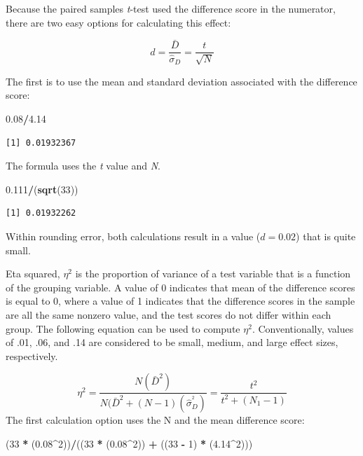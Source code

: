 \documentclass[
  11pt,
]{book}
\newenvironment{Shaded}{\begin{snugshade}}{\end{snugshade}}
\newcommand{\DecValTok}[1]{\textcolor[rgb]{0.06,0.06,0.06}{#1}}
\newcommand{\FloatTok}[1]{\textcolor[rgb]{0.06,0.06,0.06}{#1}}
\newcommand{\FunctionTok}[1]{\textcolor[rgb]{0.27,0.27,0.27}{\textbf{#1}}}
\newcommand{\NormalTok}[1]{#1}
\newcommand{\SpecialCharTok}[1]{\textcolor[rgb]{0.43,0.43,0.43}{\textbf{#1}}}
\begin{document}
Because the paired samples \emph{t}-test used the difference score in the numerator, there are two easy options for calculating this effect:

\[d=\frac{\bar{D}}{\hat\sigma_D}=\frac{t}{\sqrt{N}}\]

The first is to use the mean and standard deviation associated with the difference score:

\begin{Shaded}
\begin{Highlighting}[]
\FloatTok{0.08}\SpecialCharTok{/}\FloatTok{4.14}
\end{Highlighting}
\end{Shaded}

\begin{verbatim}
[1] 0.01932367
\end{verbatim}

The formula uses the \emph{t} value and \emph{N}.

\begin{Shaded}
\begin{Highlighting}[]
\FloatTok{0.111}\SpecialCharTok{/}\NormalTok{(}\FunctionTok{sqrt}\NormalTok{(}\DecValTok{33}\NormalTok{))}
\end{Highlighting}
\end{Shaded}

\begin{verbatim}
[1] 0.01932262
\end{verbatim}

Within rounding error, both calculations result in a value (\(d = 0.02\)) that is quite small.

Eta squared, \(\eta^2\) is the proportion of variance of a test variable that is a function of the grouping variable. A value of 0 indicates that mean of the difference scores is equal to 0, where a value of 1 indicates that the difference scores in the sample are all the same nonzero value, and the test scores do not differ within each group. The following equation can be used to compute \(\eta^2\). Conventionally, values of .01, .06, and .14 are considered to be small, medium, and large effect sizes, respectively.

\[\eta^{2} =\frac{N(\bar{D}^{2})}{N(\bar{D}^{2}+(N-1)(\hat\sigma_D^{^{2}})}=\frac{t^{2}}{{t^{2}+(N_{1}-1)}}\] The first calculation option uses the N and the mean difference score:

\begin{Shaded}
\begin{Highlighting}[]
\NormalTok{(}\DecValTok{33} \SpecialCharTok{*}\NormalTok{ (}\FloatTok{0.08}\SpecialCharTok{\^{}}\DecValTok{2}\NormalTok{))}\SpecialCharTok{/}\NormalTok{((}\DecValTok{33} \SpecialCharTok{*}\NormalTok{ (}\FloatTok{0.08}\SpecialCharTok{\^{}}\DecValTok{2}\NormalTok{)) }\SpecialCharTok{+}\NormalTok{ ((}\DecValTok{33} \SpecialCharTok{{-}} \DecValTok{1}\NormalTok{) }\SpecialCharTok{*}\NormalTok{ (}\FloatTok{4.14}\SpecialCharTok{\^{}}\DecValTok{2}\NormalTok{)))}
\end{Highlighting}
\end{Shaded}
\end{document}
